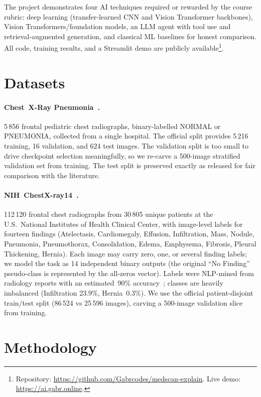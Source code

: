 \documentclass[10pt,journal,onecolumn]{IEEEtran}
\begin{document}
The project demonstrates four AI techniques required or rewarded by the course rubric: deep learning (transfer-learned CNN and Vision Transformer backbones), Vision Transformers/foundation models, an LLM agent with tool use and retrieval-augmented generation, and classical ML baselines for honest comparison. All code, training results, and a Streamlit demo are publicly available\footnote{Repository: \url{https://github.com/Gabrcodes/medscan-explain}. Live demo: \url{https://ai.gabr.online}.}.

\section{Datasets}\label{sec:data}

\paragraph{Chest~X-Ray Pneumonia~\cite{kermany2018cxr}.} 5\,856 frontal pediatric chest radiographs, binary-labelled NORMAL or PNEUMONIA, collected from a single hospital. The official split provides 5\,216 training, 16 validation, and 624 test images. The validation split is too small to drive checkpoint selection meaningfully, so we re-carve a 500-image stratified validation set from training. The test split is preserved exactly as released for fair comparison with the literature.

\paragraph{NIH~ChestX-ray14~\cite{wang2017chestxray}.} 112\,120 frontal chest radiographs from 30\,805 unique patients at the U.S.\ National Institutes of Health Clinical Center, with image-level labels for fourteen findings (Atelectasis, Cardiomegaly, Effusion, Infiltration, Mass, Nodule, Pneumonia, Pneumothorax, Consolidation, Edema, Emphysema, Fibrosis, Pleural Thickening, Hernia). Each image may carry zero, one, or several finding labels; we model the task as 14 independent binary outputs (the original ``No Finding'' pseudo-class is represented by the all-zeros vector). Labels were NLP-mined from radiology reports with an estimated~90\% accuracy~\cite{wang2017chestxray}; classes are heavily imbalanced (Infiltration 23.9\%, Hernia~0.3\%). We use the official patient-disjoint train/test split (86\,524 vs 25\,596 images), carving a 500-image validation slice from training.

\section{Methodology}\label{sec:method}
\end{document}
